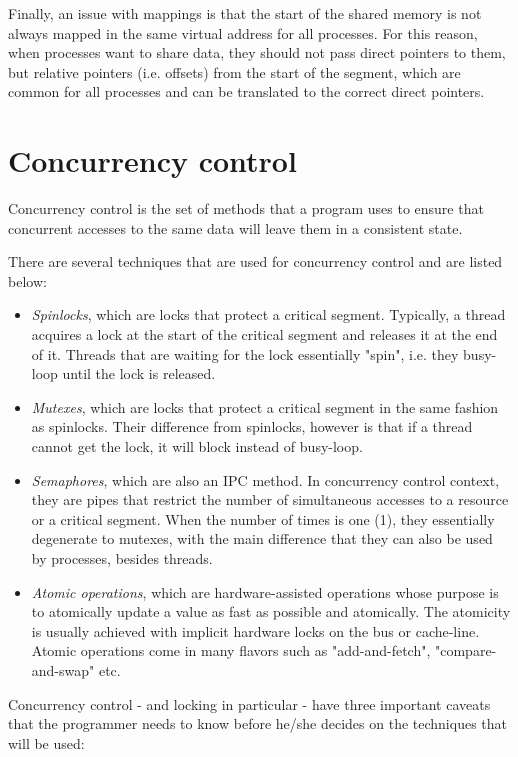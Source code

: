 Finally, an issue with mappings is that the start of the shared memory is not 
always mapped in the same virtual address for all processes. For this reason, 
when processes want to share data, they should not pass direct pointers to 
them, but relative pointers (i.e. offsets) from the start of the segment, which 
are common for all processes and can be translated to the correct direct 
pointers.

\section{Concurrency control\label{sec:conc-theory}}

Concurrency control is the set of methods that a program uses to ensure that 
concurrent accesses to the same data will leave them in a consistent state.

There are several techniques that are used for concurrency control and are 
listed below:

\begin{itemize}
	\item \textit{Spinlocks}, which are locks that protect a critical segment.  
		Typically, a thread acquires a lock at the start of the critical 
		segment and releases it at the end of it. Threads that are waiting for 
		the lock essentially "spin", i.e. they busy-loop until the lock is 
		released.
	\item \textit{Mutexes}, which are locks that protect a critical segment in 
		the same fashion as spinlocks. Their difference from spinlocks, however 
		is that if a thread cannot get the lock, it will block instead of 
		busy-loop.
	\item \textit{Semaphores}, which are also an IPC method. In concurrency 
		control context, they are pipes that restrict the number of 
		simultaneous accesses to a resource or a critical segment. When the 
		number of times is one (1), they essentially degenerate to mutexes, 
		with the main difference that they can also be used by processes,
		besides threads.
	\item \textit{Atomic operations}, which are hardware-assisted operations 
		whose purpose is to atomically update a value as fast as possible and 
		atomically. The atomicity is usually achieved with implicit hardware 
		locks on the bus or cache-line. Atomic operations come in many flavors 
		such as "add-and-fetch", "compare-and-swap" etc.
\end{itemize}

Concurrency control - and locking in particular - have three important caveats 
that the programmer needs to know before he/she decides on the techniques that 
will be used:

